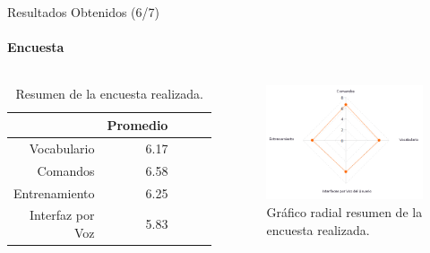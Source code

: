 \begin{frame}{Resultados Obtenidos (6/7)}
\framesubtitle{Encuesta}
\begin{columns}
\begin{table}[H] 
\centering
\tiny
\begin{tabular}{|r|r|r|r|r|}
\hline
            & Promedio \\
\hline
Vocabulario    & 6.17 \\
Comandos    & 6.58 \\
Entrenamiento  & 6.25 \\
Interfaz por Voz & 5.83 \\
\hline
\end{tabular}
\caption{Resumen de la encuesta realizada.}
\label{sec:tabla-encuesta}
\end{table} 
\begin{figure}[ht]
\centering
\includegraphics[width=1\linewidth]{./graphics/kiviat0.png}
\caption{Gr\'afico radial resumen de la encuesta realizada.}
\label{figure:kiviat-encuesta1}
\end{figure}
\end{columns}
\end{frame}

